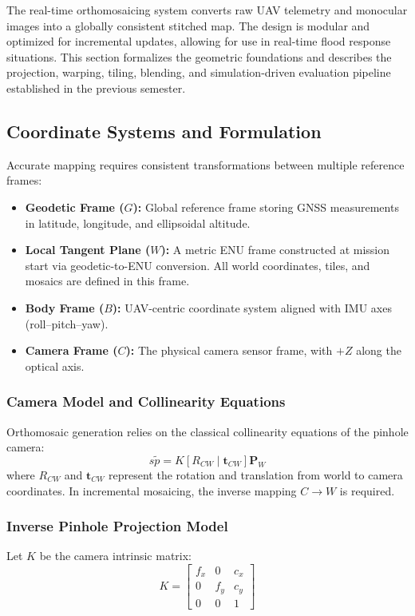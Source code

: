 \documentclass[conference]{IEEEtran}
\begin{document}
The real-time orthomosaicing system converts raw UAV telemetry and monocular images into a globally consistent stitched map. The design is modular and optimized for incremental updates, allowing for use in real-time flood response situations. This section formalizes the geometric foundations and describes the projection, warping, tiling, blending, and simulation-driven evaluation pipeline established in the previous semester.

\subsection{Coordinate Systems and Formulation}
Accurate mapping requires consistent transformations between multiple reference frames:

\begin{itemize}
    \item \textbf{Geodetic Frame ($G$):} Global reference frame storing GNSS measurements in latitude, longitude, and ellipsoidal altitude.
    \item \textbf{Local Tangent Plane ($W$):} A metric ENU frame constructed at mission start via geodetic-to-ENU conversion. All world coordinates, tiles, and mosaics are defined in this frame.
    \item \textbf{Body Frame ($B$):} UAV-centric coordinate system aligned with IMU axes (roll--pitch--yaw).
    \item \textbf{Camera Frame ($C$):} The physical camera sensor frame, with $+Z$ along the optical axis.
\end{itemize}

\subsubsection{Camera Model and Collinearity Equations}
Orthomosaic generation relies on the classical collinearity equations of the pinhole camera:
\begin{equation}
s \tilde{p} = K [R_{CW} \mid \mathbf{t}_{CW}] \mathbf{P}_W
\end{equation}
where $R_{CW}$ and $\mathbf{t}_{CW}$ represent the rotation and translation from world to camera coordinates. In incremental mosaicing, the inverse mapping $C \rightarrow W$ is required.

\subsubsection{Inverse Pinhole Projection Model}
Let $K$ be the camera intrinsic matrix:
\begin{equation}
K = \begin{bmatrix}
f_x & 0 & c_x \\
0 & f_y & c_y \\
0 & 0 & 1
\end{bmatrix}
\end{equation}
\end{document}
